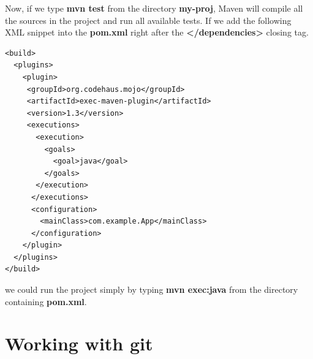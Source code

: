\documentclass[oneside]{book}
\begin{document}
Now, if we type \textbf{mvn test} from the directory \textbf{my-proj}, Maven will compile all the sources in the project and run all available tests. If we add the following XML snippet into the \textbf{pom.xml} right after the \textbf{</dependencies>} closing tag.
\begin{lstlisting}
<build>
  <plugins>
    <plugin>
     <groupId>org.codehaus.mojo</groupId>
     <artifactId>exec-maven-plugin</artifactId>
     <version>1.3</version>
     <executions>
       <execution>
         <goals>
           <goal>java</goal>
         </goals>
       </execution>
      </executions>
      <configuration>
        <mainClass>com.example.App</mainClass>
      </configuration>
    </plugin>
  </plugins>
</build>
\end{lstlisting}
we could run the project simply by typing \textbf{mvn exec:java} from the directory containing \textbf{pom.xml}.

\section{Working with git}
\end{document}
